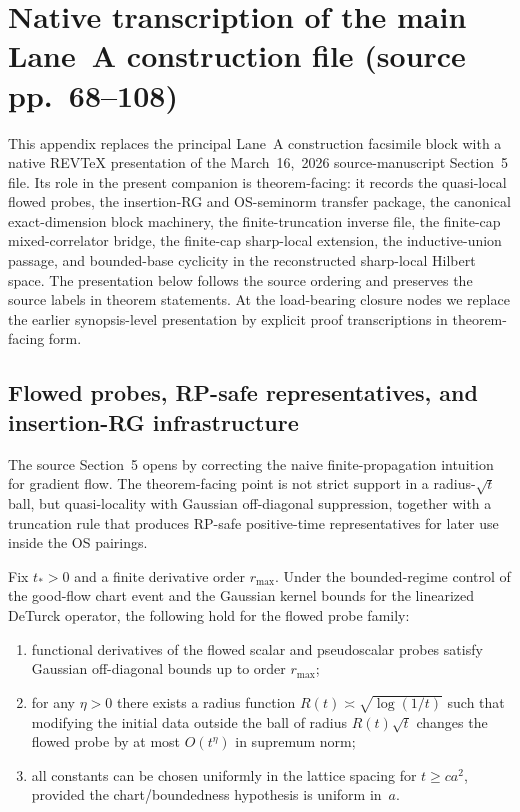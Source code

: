 \section{Native transcription of the main Lane~A construction file (source pp.~68--108)}
This appendix replaces the principal Lane~A construction facsimile block with a native REV\TeX{} presentation of the March~16,~2026 source-manuscript Section~5 file. Its role in the present companion is theorem-facing: it records the quasi-local flowed probes, the insertion-RG and OS-seminorm transfer package, the canonical exact-dimension block machinery, the finite-truncation inverse file, the finite-cap mixed-correlator bridge, the finite-cap sharp-local extension, the inductive-union passage, and bounded-base cyclicity in the reconstructed sharp-local Hilbert space. The presentation below follows the source ordering and preserves the source labels in theorem statements. At the load-bearing closure nodes we replace the earlier synopsis-level presentation by explicit proof transcriptions in theorem-facing form.

\subsection{Flowed probes, RP-safe representatives, and insertion-RG infrastructure}
The source Section~5 opens by correcting the naive finite-propagation intuition for gradient flow. The theorem-facing point is not strict support in a radius-$\sqrt t$ ball, but quasi-locality with Gaussian off-diagonal suppression, together with a truncation rule that produces RP-safe positive-time representatives for later use inside the OS pairings.

\begin{theorem}
Fix $t_\ast>0$ and a finite derivative order $r_{\max}$. Under the bounded-regime control of the good-flow chart event and the Gaussian kernel bounds for the linearized DeTurck operator, the following hold for the flowed probe family:
\begin{enumerate}[label=(\roman*),leftmargin=2.2em]
\item functional derivatives of the flowed scalar and pseudoscalar probes satisfy Gaussian off-diagonal bounds up to order $r_{\max}$;
\item for any $\eta>0$ there exists a radius function $R(t)\asymp \sqrt{\log(1/t)}$ such that modifying the initial data outside the ball of radius $R(t)\sqrt t$ changes the flowed probe by at most $O(t^\eta)$ in supremum norm;
\item all constants can be chosen uniformly in the lattice spacing for $t\ge c a^2$, provided the chart/boundedness hypothesis is uniform in~$a$.
\end{enumerate}
\end{theorem}

